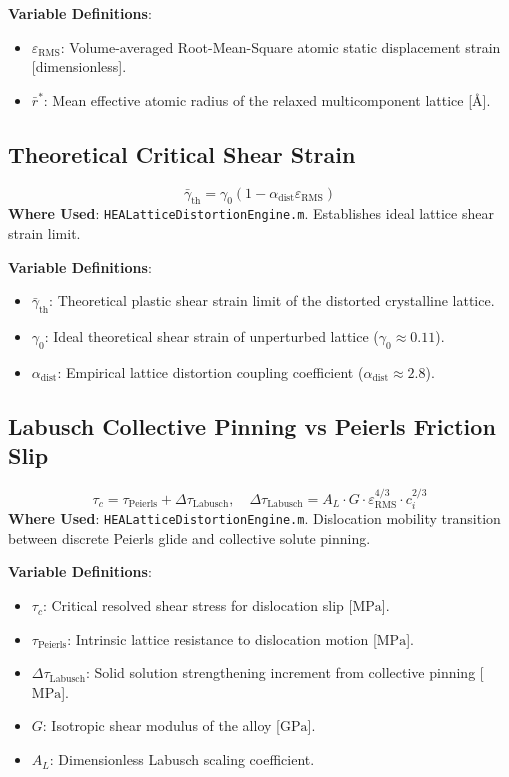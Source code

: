\documentclass[11pt,a4paper]{article}
\begin{document}
\noindent\textbf{Variable Definitions}:
\begin{itemize}
  \item $\varepsilon_{\text{RMS}}$: Volume-averaged Root-Mean-Square atomic static displacement strain [dimensionless].
  \item $\bar{r}^*$: Mean effective atomic radius of the relaxed multicomponent lattice [$\text{\AA}$].
\end{itemize}

\subsection{Theoretical Critical Shear Strain}
\begin{equation}
\bar{\gamma}_{\text{th}} = \gamma_0 \left(1 - \alpha_{\text{dist}} \varepsilon_{\text{RMS}}\right)
\end{equation}
\textbf{Where Used}: \texttt{HEALatticeDistortionEngine.m}. Establishes ideal lattice shear strain limit.

\noindent\textbf{Variable Definitions}:
\begin{itemize}
  \item $\bar{\gamma}_{\text{th}}$: Theoretical plastic shear strain limit of the distorted crystalline lattice.
  \item $\gamma_0$: Ideal theoretical shear strain of unperturbed lattice ($\gamma_0 \approx 0.11$).
  \item $\alpha_{\text{dist}}$: Empirical lattice distortion coupling coefficient ($\alpha_{\text{dist}} \approx 2.8$).
\end{itemize}

\subsection{Labusch Collective Pinning vs Peierls Friction Slip}
\begin{equation}
\tau_c = \tau_{\text{Peierls}} + \Delta\tau_{\text{Labusch}}, \quad \Delta\tau_{\text{Labusch}} = A_L \cdot G \cdot \varepsilon_{\text{RMS}}^{4/3} \cdot c_i^{2/3}
\end{equation}
\textbf{Where Used}: \texttt{HEALatticeDistortionEngine.m}. Dislocation mobility transition between discrete Peierls glide and collective solute pinning.

\noindent\textbf{Variable Definitions}:
\begin{itemize}
  \item $\tau_c$: Critical resolved shear stress for dislocation slip [$\text{MPa}$].
  \item $\tau_{\text{Peierls}}$: Intrinsic lattice resistance to dislocation motion [$\text{MPa}$].
  \item $\Delta\tau_{\text{Labusch}}$: Solid solution strengthening increment from collective pinning [$\text{MPa}$].
  \item $G$: Isotropic shear modulus of the alloy [$\text{GPa}$].
  \item $A_L$: Dimensionless Labusch scaling coefficient.
\end{itemize}
\end{document}
